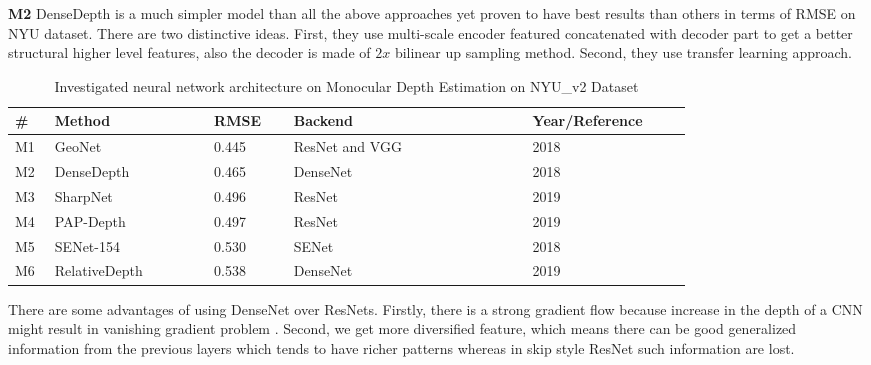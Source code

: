 \textbf{M2} DenseDepth is a much simpler model than all the above approaches yet proven to have best results than others in terms of RMSE on NYU dataset. There are two distinctive  ideas. First, they use multi-scale encoder featured concatenated with decoder part to get a better structural higher level features, also the decoder is made of \(2 x \) bilinear up sampling method. Second, they use transfer learning approach.  

\begin{table}[t]
\centering
\begin{tabular}{p{0.05\linewidth}p{0.2\linewidth}p{0.1\linewidth}p{0.3\linewidth}p{0.2\linewidth}}


\hline
\textbf{\# } & \textbf{Method} & \textbf{RMSE} & \textbf{Backend}& \textbf{Year/Reference} \\ \hline\hline
M1              & GeoNet          & 0.445             & ResNet and VGG  & 2018 \cite{qi2018geonet}          \\ \hline
M2              & DenseDepth      & 0.465             & DenseNet        & 2018 \cite{Alhashim2018}         \\ \hline
M3              & SharpNet        & 0.496             & ResNet       & 2019 \cite{ramamonjisoa2019sharpnet}\\ \hline
M4              & PAP-Depth       & 0.497             & ResNet          & 2019 \cite{Zhang_2019_CVPR}         \\ \hline
M5              & SENet-154       & 0.530             & SENet           & 2018 \cite{hu2019revisiting}          \\ \hline
M6              & RelativeDepth   & 0.538             & DenseNet        & 2019 \cite{lee2019monocular}          \\ \hline
\end{tabular}

\caption{Investigated neural network architecture on Monocular Depth Estimation on NYU\_v2 Dataset}
\label{table:RelatedWork_STA_Architecture}

\end{table}


There are some advantages of using DenseNet over ResNets. Firstly, there is a strong gradient flow because increase in the depth of a CNN might result in vanishing gradient problem . Second, we get more diversified feature, which means there can be good generalized information from the previous layers which tends to have richer patterns whereas in skip style ResNet such information are lost. 

